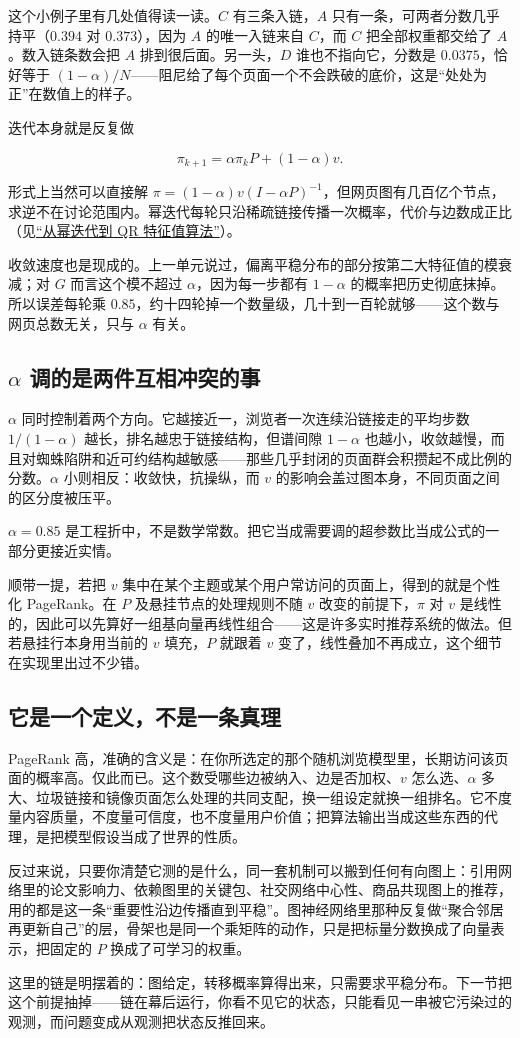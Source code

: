 这个小例子里有几处值得读一读。\(C\) 有三条入链，\(A\) 只有一条，可两者分数几乎持平（\(0.394\) 对 \(0.373\)），因为 \(A\) 的唯一入链来自 \(C\)，而 \(C\) 把全部权重都交给了 \(A\)。数入链条数会把 \(A\) 排到很后面。另一头，\(D\) 谁也不指向它，分数是 \(0.0375\)，恰好等于 \((1-\alpha)/N\)——阻尼给了每个页面一个不会跌破的底价，这是``处处为正''在数值上的样子。

迭代本身就是反复做

\[
\pi_{k+1}=\alpha\pi_kP+(1-\alpha)v.
\]

形式上当然可以直接解 \(\pi=(1-\alpha)v(I-\alpha P)^{-1}\)，但网页图有几百亿个节点，求逆不在讨论范围内。幂迭代每轮只沿稀疏链接传播一次概率，代价与边数成正比（见\hyperref[sec:08-Numerical-Analysis/05-Numerical-Linear-Algebra/05]{``从幂迭代到 QR 特征值算法''}）。

收敛速度也是现成的。上一单元说过，偏离平稳分布的部分按第二大特征值的模衰减；对 \(G\) 而言这个模不超过 \(\alpha\)，因为每一步都有 \(1-\alpha\) 的概率把历史彻底抹掉。所以误差每轮乘 \(0.85\)，约十四轮掉一个数量级，几十到一百轮就够——这个数与网页总数无关，只与 \(\alpha\) 有关。

\subsection{\texorpdfstring{\(\alpha\) 调的是两件互相冲突的事}{alpha 调的是两件互相冲突的事}}

\(\alpha\) 同时控制着两个方向。它越接近一，浏览者一次连续沿链接走的平均步数 \(1/(1-\alpha)\) 越长，排名越忠于链接结构，但谱间隙 \(1-\alpha\) 也越小，收敛越慢，而且对蜘蛛陷阱和近可约结构越敏感——那些几乎封闭的页面群会积攒起不成比例的分数。\(\alpha\) 小则相反：收敛快，抗操纵，而 \(v\) 的影响会盖过图本身，不同页面之间的区分度被压平。

\(\alpha=0.85\) 是工程折中，不是数学常数。把它当成需要调的超参数比当成公式的一部分更接近实情。

顺带一提，若把 \(v\) 集中在某个主题或某个用户常访问的页面上，得到的就是个性化 PageRank。在 \(P\) 及悬挂节点的处理规则不随 \(v\) 改变的前提下，\(\pi\) 对 \(v\) 是线性的，因此可以先算好一组基向量再线性组合——这是许多实时推荐系统的做法。但若悬挂行本身用当前的 \(v\) 填充，\(P\) 就跟着 \(v\) 变了，线性叠加不再成立，这个细节在实现里出过不少错。

\subsection{它是一个定义，不是一条真理}

PageRank 高，准确的含义是：在你所选定的那个随机浏览模型里，长期访问该页面的概率高。仅此而已。这个数受哪些边被纳入、边是否加权、\(v\) 怎么选、\(\alpha\) 多大、垃圾链接和镜像页面怎么处理的共同支配，换一组设定就换一组排名。它不度量内容质量，不度量可信度，也不度量用户价值；把算法输出当成这些东西的代理，是把模型假设当成了世界的性质。

反过来说，只要你清楚它测的是什么，同一套机制可以搬到任何有向图上：引用网络里的论文影响力、依赖图里的关键包、社交网络中心性、商品共现图上的推荐，用的都是这一条``重要性沿边传播直到平稳''。图神经网络里那种反复做``聚合邻居再更新自己''的层，骨架也是同一个乘矩阵的动作，只是把标量分数换成了向量表示，把固定的 \(P\) 换成了可学习的权重。

这里的链是明摆着的：图给定，转移概率算得出来，只需要求平稳分布。下一节把这个前提抽掉——链在幕后运行，你看不见它的状态，只能看见一串被它污染过的观测，而问题变成从观测把状态反推回来。
